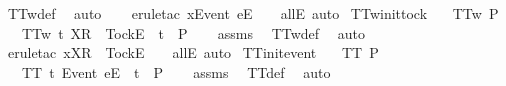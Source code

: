 \begin{isabellebody}
\ TT{}w{\isacharunderscore}def\ \isamarkupfalse%
\ {\isacharparenleft}auto{\isacharparenright}\isanewline
\ \ \isamarkupfalse%
\ {\isacharparenleft}erule{\isacharunderscore}tac\ x{\isacharequal}{\isachardoublequoteopen}{\isacharbrackleft}Event\ e{\isacharbrackright}\isactrlsub E\ {\isacharhash}\ {\isasymrho}{\isachardoublequoteclose}\ \ allE{\isacharcomma}\ auto{\isacharparenright}%
\endisatagproof
{\isafoldproof}%
%
\isadelimproof
\isanewline
%
\endisadelimproof
\isanewline
{}\isamarkupfalse%
\ TT{}w{\isacharunderscore}init{\isacharunderscore}tock{\isacharcolon}\isanewline
\ \ \ {\isachardoublequoteopen}TT{}w\ P{\isachardoublequoteclose}\isanewline
\ \ \ {\isachardoublequoteopen}TT{}w\ {\isacharbraceleft}t{\isachardot}\ {\isacharbrackleft}X{\isacharbrackright}\isactrlsub R\ {\isacharhash}\ {\isacharbrackleft}Tock{\isacharbrackright}\isactrlsub E\ {\isacharhash}\ t\ {\isasymin}\ P{\isacharbraceright}{\isachardoublequoteclose}\isanewline
%
\isadelimproof
\ \ %
\endisadelimproof
%
\isatagproof
{}\isamarkupfalse%
\ assms\ \isamarkupfalse%
\ TT{}w{\isacharunderscore}def\ \isamarkupfalse%
\ {\isacharparenleft}auto{\isacharparenright}\isanewline
\ \ \isamarkupfalse%
\ {\isacharparenleft}erule{\isacharunderscore}tac\ x{\isacharequal}{\isachardoublequoteopen}{\isacharbrackleft}X{\isacharbrackright}\isactrlsub R\ {\isacharhash}\ {\isacharbrackleft}Tock{\isacharbrackright}\isactrlsub E\ {\isacharhash}\ {\isasymrho}{\isachardoublequoteclose}\ \ allE{\isacharcomma}\ auto{\isacharparenright}%
\endisatagproof
{\isafoldproof}%
%
\isadelimproof
\isanewline
%
\endisadelimproof
\isanewline
{}\isamarkupfalse%
\ TT{}{\isacharunderscore}init{\isacharunderscore}event{\isacharcolon}\isanewline
\ \ \ {\isachardoublequoteopen}TT{}\ P{\isachardoublequoteclose}\isanewline
\ \ \ {\isachardoublequoteopen}TT{}\ {\isacharbraceleft}t{\isachardot}\ {\isacharbrackleft}Event\ e{\isacharbrackright}\isactrlsub E\ {\isacharhash}\ t\ {\isasymin}\ P{\isacharbraceright}{\isachardoublequoteclose}\isanewline
%
\isadelimproof
\ \ %
\endisadelimproof
%
\isatagproof
{}\isamarkupfalse%
\ assms\ \isamarkupfalse%
\ TT{}{\isacharunderscore}def\ \isamarkupfalse%
\ {\isacharparenleft}auto{\isacharparenright}\isanewline

\end{isabellebody}
